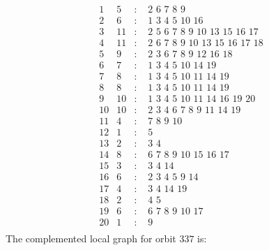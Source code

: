 \documentclass[12pt]{article}
\begin{document}
\begin{equation*}
\begin{array}{rrcl}
1&5&:&\,\,2\,\,6\,\,7\,\,8\,\,9\\
2&6&:&\,\,1\,\,3\,\,4\,\,5\,\,10\,\,16\\
3&11&:&\,\,2\,\,5\,\,6\,\,7\,\,8\,\,9\,\,10\,\,13\,\,15\,\,16\,\,17\\
4&11&:&\,\,2\,\,6\,\,7\,\,8\,\,9\,\,10\,\,13\,\,15\,\,16\,\,17\,\,18\\
5&9&:&\,\,2\,\,3\,\,6\,\,7\,\,8\,\,9\,\,12\,\,16\,\,18\\
6&7&:&\,\,1\,\,3\,\,4\,\,5\,\,10\,\,14\,\,19\\
7&8&:&\,\,1\,\,3\,\,4\,\,5\,\,10\,\,11\,\,14\,\,19\\
8&8&:&\,\,1\,\,3\,\,4\,\,5\,\,10\,\,11\,\,14\,\,19\\
9&10&:&\,\,1\,\,3\,\,4\,\,5\,\,10\,\,11\,\,14\,\,16\,\,19\,\,20\\
10&10&:&\,\,2\,\,3\,\,4\,\,6\,\,7\,\,8\,\,9\,\,11\,\,14\,\,19\\
11&4&:&\,\,7\,\,8\,\,9\,\,10\\
12&1&:&\,\,5\\
13&2&:&\,\,3\,\,4\\
14&8&:&\,\,6\,\,7\,\,8\,\,9\,\,10\,\,15\,\,16\,\,17\\
15&3&:&\,\,3\,\,4\,\,14\\
16&6&:&\,\,2\,\,3\,\,4\,\,5\,\,9\,\,14\\
17&4&:&\,\,3\,\,4\,\,14\,\,19\\
18&2&:&\,\,4\,\,5\\
19&6&:&\,\,6\,\,7\,\,8\,\,9\,\,10\,\,17\\
20&1&:&\,\,9\\
\end{array}
\end{equation*}
The complemented local graph for orbit $337$ is:
\end{document}
